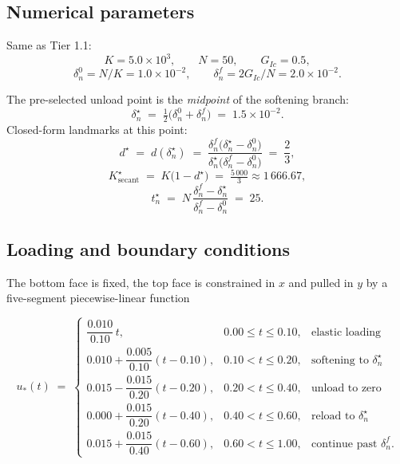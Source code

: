 \subsection{Numerical parameters}

Same as Tier 1.1:
\begin{equation}
K = 5.0\times10^{3},\qquad
N = 50,\qquad
G_{Ic} = 0.5,
\end{equation}
\begin{equation}
\delta_n^{0} = N/K = 1.0\times10^{-2},\qquad
\delta_n^{f} = 2 G_{Ic}/N = 2.0\times10^{-2}.
\end{equation}

The pre-selected unload point is the \emph{midpoint} of the softening
branch:
\begin{equation}
\delta_n^{\star} \;=\; \tfrac{1}{2}\bigl(\delta_n^{0}+\delta_n^{f}\bigr)
\;=\; 1.5\times10^{-2}.
\end{equation}
Closed-form landmarks at this point:
\begin{equation}
d^{\star} \;=\; d(\delta_n^{\star})
\;=\; \frac{\delta_n^{f}\bigl(\delta_n^{\star}-\delta_n^{0}\bigr)}
           {\delta_n^{\star}\bigl(\delta_n^{f}-\delta_n^{0}\bigr)}
\;=\; \frac{2}{3},
\end{equation}
\begin{equation}
K_{\text{secant}}^{\star} \;=\; K\bigl(1-d^{\star}\bigr)
\;=\; \tfrac{5\,000}{3} \approx 1\,666.67,
\end{equation}
\begin{equation}
t_n^{\star} \;=\; N\,\frac{\delta_n^{f}-\delta_n^{\star}}
                          {\delta_n^{f}-\delta_n^{0}}
\;=\; 25.
\end{equation}

\subsection{Loading and boundary conditions}

The bottom face is fixed, the top face is constrained in $x$ and pulled in
$y$ by a five-segment piecewise-linear function

\begin{equation}
u_*(t) \;=\;
\begin{cases}
\dfrac{0.010}{0.10}\,t,
& 0.00 \le t \le 0.10,
& \text{elastic loading} \\[6pt]
0.010 + \dfrac{0.005}{0.10}(t-0.10),
& 0.10 < t \le 0.20,
& \text{softening to }\delta_n^{\star} \\[6pt]
0.015 - \dfrac{0.015}{0.20}(t-0.20),
& 0.20 < t \le 0.40,
& \text{unload to zero} \\[6pt]
0.000 + \dfrac{0.015}{0.20}(t-0.40),
& 0.40 < t \le 0.60,
& \text{reload to }\delta_n^{\star} \\[6pt]
0.015 + \dfrac{0.015}{0.40}(t-0.60),
& 0.60 < t \le 1.00,
& \text{continue past }\delta_n^{f}.
\end{cases}
\end{equation}

